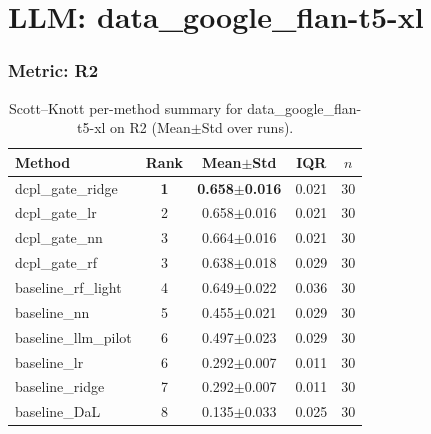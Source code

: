 \section*{LLM: data\_google\_flan-t5-xl}

\subsubsection*{Metric: R2}
\begin{table}[H]
\centering
\scriptsize
\setlength{\tabcolsep}{4pt}
\renewcommand{\arraystretch}{1.1}
\caption{Scott--Knott per-method summary for data\_google\_flan-t5-xl on R2 (Mean$\pm$Std over runs).}
\label{tab:sk_data_google_flan-t5-xl_R2}
\begin{tabular}{l|c|c|c|c}
\hline
\textbf{Method} & \textbf{Rank} & \textbf{Mean$\pm$Std} & \textbf{IQR} & \textbf{$n$} \\
\hline
\rowcolor{red!15} dcpl\_gate\_ridge & \textbf{1} & \textbf{0.658$\pm$0.016} & 0.021 & 30 \\
dcpl\_gate\_lr & 2 & 0.658$\pm$0.016 & 0.021 & 30 \\
dcpl\_gate\_nn & 3 & 0.664$\pm$0.016 & 0.021 & 30 \\
dcpl\_gate\_rf & 3 & 0.638$\pm$0.018 & 0.029 & 30 \\
baseline\_rf\_light & 4 & 0.649$\pm$0.022 & 0.036 & 30 \\
baseline\_nn & 5 & 0.455$\pm$0.021 & 0.029 & 30 \\
baseline\_llm\_pilot & 6 & 0.497$\pm$0.023 & 0.029 & 30 \\
baseline\_lr & 6 & 0.292$\pm$0.007 & 0.011 & 30 \\
baseline\_ridge & 7 & 0.292$\pm$0.007 & 0.011 & 30 \\
baseline\_DaL & 8 & 0.135$\pm$0.033 & 0.025 & 30 \\
\hline
\end{tabular}
\end{table}

